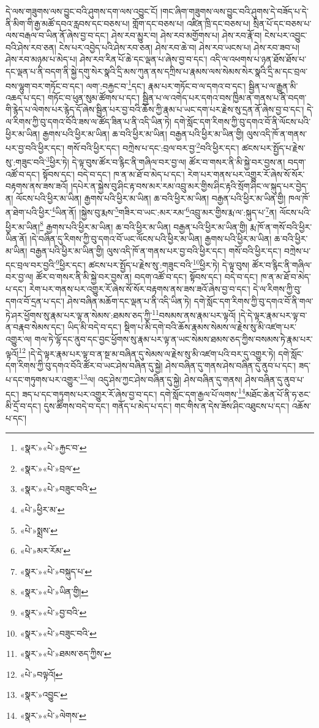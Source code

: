 དེ་ལས་གཟུགས་ལས་བྱུང་བའི་ཤུགས་དག་ལས་འབྱུང་ངོ། །གང་ཞིག་གཟུགས་ལས་བྱུང་བའི་ཤུགས་དེ་བཟོད་པ་དེ་ནི་མིག་གི་རྒྱ་མཚོ་དབའ་རླབས་དང་བཅས་པ། གློག་དང་བཅས་པ། འཛིན་ཁྲི་དང་བཅས་པ། སྲིན་པོ་དང་བཅས་པ་ལས་བརྒལ་བ་ཡིན་ནོ་ཞེས་བྱ་བ་དང་། ཤེས་རབ་མྱུར་བ། ཤེས་རབ་མགྱོགས་པ། ཤེས་རབ་རྣོ་བ། ངེས་པར་འབྱུང་བའི་ཤེས་རབ་ཅན། ངེས་པར་འབྱེད་པའི་ཤེས་རབ་ཅན། ཤེས་རབ་ཆེ་བ། ཤེས་རབ་ཡངས་པ། ཤེས་རབ་ཟབ་པ། ཤེས་རབ་མཉམ་པ་མེད་པ། ཤེས་རབ་རིན་པོ་ཆེ་དང་ལྡན་པ་ཞེས་བྱ་བ་དང་། འདི་ལ་འཕགས་པ་ཉན་ཐོས་ཐོས་པ་དང་ལྡན་པ་ནི་བདག་ནི་སྐྱེ་དགུ་སེར་སྣའི་དྲི་མས་ཀུན་ནས་དཀྲིས་པ་རྣམས་ལས་སེམས་སེར་སྣའི་དྲི་མ་དང་བྲལ་བས་ལྷུག་བར་གཏོང་བ་དང་། ལག་:བརྐྱང་བ་\footnote{«སྣར་»«པེ་»རྐྱང་བ་}དང་། རྣམ་པར་གཏོང་བ་ལ་དགའ་བ་དང་། སྦྱིན་པ་ལ་རྒྱུན་མི་འཆད་པ་དང་། གཏོང་བ་ཕུན་སུམ་ཚོགས་པ་དང་། སྦྱིན་པ་ལ་འགེད་པར་དགའ་བས་ཁྱིམ་ན་གནས་པ་ནི་བདག་གི་རྙེད་པ་ལེགས་པར་རྙེད་དོ་ཞེས་སྦྱིན་པར་བྱ་བའི་ཆོས་ཀྱི་རྣམ་པ་ཡང་དག་པར་རྗེས་སུ་དྲན་ནོ་ཞེས་བྱ་བ་དང་། དེ་ལ་རིགས་ཀྱི་བུ་དགའ་བོའི་ཟས་ལ་ཚོད་ཟིན་པ་ནི་འདི་ཡིན་ཏེ། དགེ་སློང་དག་རིགས་ཀྱི་བུ་དགའ་བོ་ནི་ལོངས་པའི་ཕྱིར་མ་ཡིན། རྒྱགས་པའི་ཕྱིར་མ་ཡིན། ཆ་བའི་ཕྱིར་མ་ཡིན། བརྒྱན་པའི་ཕྱིར་མ་ཡིན་གྱི། ལུས་འདི་ཁོ་ན་གནས་པར་བྱ་བའི་ཕྱིར་དང་། གསོ་བའི་ཕྱིར་དང་། བཀྲེས་པ་དང་:བྲལ་བར་བྱ་\footnote{«སྣར་»«པེ་»བྲལ་}བའི་ཕྱིར་དང་། ཚངས་པར་སྤྱོད་པ་རྗེས་སུ་:གཟུང་བའི་\footnote{«སྣར་»«པེ་»བཟུང་བའི་}ཕྱིར་ཏེ། དེ་ལྟ་བུས་ཚོར་བ་རྙིང་ནི་གཞིལ་བར་བྱ་ལ། ཚོར་བ་གསར་ནི་མི་སྐྱེ་བར་བྱས་ན། བདག་འཚོ་བ་དང་། སྟོབས་དང་། བདེ་བ་དང་། ཁ་ན་མ་ཐོ་བ་མེད་པ་དང་། རེག་པར་གནས་པར་འགྱུར་རོ་ཞེས་སོ་སོར་བརྟགས་ནས་ཟས་ཟའོ། །དཔེར་ན་སྐྱེས་བུ་ཤིང་རྟ་བས་མར་རམ་འབྲུ་མར་གྱིས་ཤིང་རྟའི་སྲོག་ཤིང་ལ་སྐུད་པར་བྱེད་ན། ལོངས་པའི་ཕྱིར་མ་ཡིན། རྒྱགས་པའི་ཕྱིར་མ་ཡིན། ཆ་བའི་ཕྱིར་མ་ཡིན། བརྒྱན་པའི་ཕྱིར་མ་ཡིན་གྱི། ཁལ་ཁོ་ན་ཐེག་པའི་ཕྱིར་\footnote{«པེ་»ཕྱིར་མ་}ཡིན་ནོ། །སྐྱེས་བུ་རྨས་\footnote{«པེ་»སྨྲས་}གཟིར་བ་ཡང་:མར་རམ་\footnote{«པེ་»མར་རོམ་}འབྲུ་མར་གྱིས་རྨ་ལ་:སྐུད་པ་\footnote{«སྣར་»«པེ་»བསྐུད་པ་}ན། ལོངས་པའི་ཕྱིར་མ་ཡིན།\footnote{«སྣར་»«པེ་»ཡིན་གྱི།} རྒྱགས་པའི་ཕྱིར་མ་ཡིན། ཆ་བའི་ཕྱིར་མ་ཡིན། བརྒྱན་པའི་ཕྱིར་མ་ཡིན་གྱི། རྨ་ཁོ་ན་གསོ་བའི་ཕྱིར་ཡིན་ནོ། །དེ་བཞིན་དུ་རིགས་ཀྱི་བུ་དགའ་བོ་ཡང་ལོངས་པའི་ཕྱིར་མ་ཡིན། རྒྱགས་པའི་ཕྱིར་མ་ཡིན། ཆ་བའི་ཕྱིར་མ་ཡིན། བརྒྱན་པའི་ཕྱིར་མ་ཡིན་གྱི། ལུས་འདི་ཁོ་ན་གནས་པར་བྱ་བའི་ཕྱིར་དང་། གསོ་བའི་ཕྱིར་དང་། བཀྲེས་པ་དང་བྲལ་བར་བྱའི་\footnote{«སྣར་»«པེ་»བྱ་བའི་}ཕྱིར་དང་། ཚངས་པར་སྤྱོད་པ་རྗེས་སུ་:གཟུང་བའི་\footnote{«སྣར་»«པེ་»བཟུང་བའི་}ཕྱིར་ཏེ། དེ་ལྟ་བུས། ཚོར་བ་རྙིང་ནི་གཞིལ་བར་བྱ་ལ། ཚོར་བ་གསར་ནི་མི་སྐྱེ་བར་བྱས་ན། བདག་འཚོ་བ་དང་། སྟོབས་དང་། བདེ་བ་དང་། ཁ་ན་མ་ཐོ་བ་མེད་པ་དང་། རེག་པར་གནས་པར་འགྱུར་རོ་ཞེས་སོ་སོར་བརྟགས་ནས་ཟས་ཟའོ་ཞེས་བྱ་བ་དང་། དེ་ལ་རིགས་ཀྱི་བུ་དགའ་བོ་དྲན་པ་དང་། ཤེས་བཞིན་མཆོག་དང་ལྡན་པ་ནི་འདི་ཡིན་ཏེ། དགེ་སློང་དག་རིགས་ཀྱི་བུ་དགའ་བོ་ནི་གལ་ཏེ་ཤར་ཕྱོགས་སུ་རྣམ་པར་ལྟ་ན་སེམས་:ཐམས་ཅད་ཀྱི་\footnote{«སྣར་»«པེ་»ཐམས་ཅད་ཀྱིས་}བསམས་ནས་རྣམ་པར་ལྟའོ། །དེ་དེ་ལྟར་རྣམ་པར་ལྟ་བ་ན་བརྣབ་སེམས་དང་། ཡིད་མི་བདེ་བ་དང་། སྡིག་པ་མི་དགེ་བའི་ཆོས་རྣམས་སེམས་ལ་རྗེས་སུ་མི་འཛག་པར་འགྱུར་ལ། གལ་ཏེ་ལྷོ་དང་ནུབ་དང་བྱང་ཕྱོགས་སུ་རྣམ་པར་ལྟ་ན་ཡང་སེམས་ཐམས་ཅད་ཀྱིས་བསམས་ཏེ་རྣམ་པར་ལྟའོ།\footnote{«པེ་»བལྟའོ།} །དེ་དེ་ལྟར་རྣམ་པར་ལྟ་བ་ན་སྔ་མ་བཞིན་དུ་སེམས་ལ་རྗེས་སུ་མི་འཛག་པའི་བར་དུ་འགྱུར་ཏེ། དགེ་སློང་དག་རིགས་ཀྱི་བུ་དགའ་བོའི་ཚོར་བ་ཡང་ཤེས་བཞིན་དུ་སྐྱེ། ཤེས་བཞིན་དུ་གནས་ཤེས་བཞིན་དུ་ནུབ་པ་དང་། ཟད་པ་དང་གཏུགས་པར་འགྱུར་\footnote{«སྣར་»འབྱུང་}ལ། འདུ་ཤེས་ཀྱང་ཤེས་བཞིན་དུ་སྐྱེ། ཤེས་བཞིན་དུ་གནས། ཤེས་བཞིན་དུ་ནུབ་པ་དང་། ཟད་པ་དང་གཏུགས་པར་འགྱུར་རོ་ཞེས་བྱ་བ་དང་། དགེ་སློང་དག་རྒྱལ་པོ་ལགས་\footnote{«སྣར་»«པེ་»ལེགས་}མཐོང་ཆེན་པོ་ནི་ཧ་ཅང་མི་དྲོ་བ་དང་། དུས་ཚིགས་བདེ་བ་དང་། གནོད་པ་མེད་པ་དང་། གང་གིས་ན་དེས་ཟོས་ཤིང་འཐུངས་པ་དང་། འཆོས་པ་དང་། 